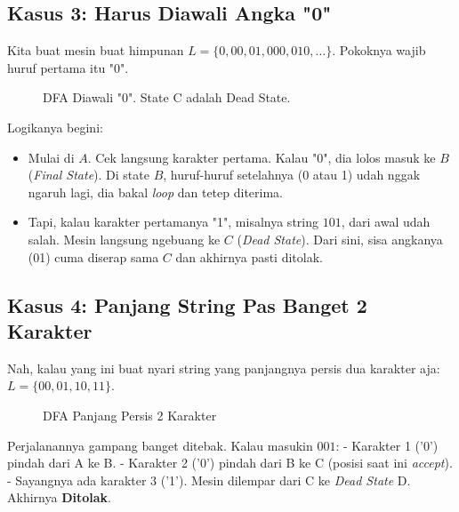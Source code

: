 \documentclass[12pt,a4paper]{article}
\begin{document}
\subsection{Kasus 3: Harus Diawali Angka "0"}
Kita buat mesin buat himpunan $L = \{0, 00, 01, 000, 010, \dots\}$. Pokoknya wajib huruf pertama itu "0".

\begin{figure}[h]
    \centering
    \caption{DFA Diawali "0". State C adalah Dead State.}
\end{figure}

Logikanya begini:
\begin{itemize}
    \item Mulai di $A$. Cek langsung karakter pertama. Kalau "0", dia lolos masuk ke $B$ (\textit{Final State}). Di state $B$, huruf-huruf setelahnya (0 atau 1) udah nggak ngaruh lagi, dia bakal \textit{loop} dan tetep diterima.
    \item Tapi, kalau karakter pertamanya "1", misalnya string $101$, dari awal udah salah. Mesin langsung ngebuang ke $C$ (\textit{Dead State}). Dari sini, sisa angkanya (01) cuma diserap sama $C$ dan akhirnya pasti ditolak.
\end{itemize}

\subsection{Kasus 4: Panjang String Pas Banget 2 Karakter}
Nah, kalau yang ini buat nyari string yang panjangnya persis dua karakter aja: $L = \{00, 01, 10, 11\}$.
\begin{figure}[h]
    \centering
    \caption{DFA Panjang Persis 2 Karakter}
\end{figure}
Perjalanannya gampang banget ditebak. Kalau masukin $001$:
- Karakter 1 ('0') pindah dari A ke B.
- Karakter 2 ('0') pindah dari B ke C (posisi saat ini \textit{accept}).
- Sayangnya ada karakter 3 ('1'). Mesin dilempar dari C ke \textit{Dead State} D. Akhirnya \textbf{Ditolak}.
\end{document}

